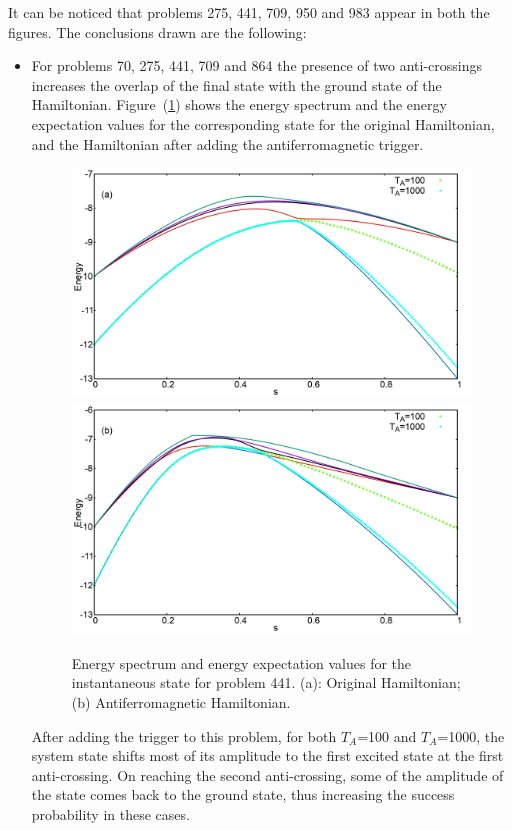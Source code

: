 \documentclass[../main.tex]{subfiles}
\begin{document}
It can be noticed that problems 275, 441, 709, 950 and 983 appear in both the figures. The conclusions drawn are the following:
\begin{itemize}
\item For problems 70, 275, 441, 709 and 864 the presence of two anti-crossings increases the overlap of the final state with the ground state of the Hamiltonian. Figure~(\ref{fig:a28}) shows the energy spectrum and the energy expectation values for the corresponding state for the original Hamiltonian, and the Hamiltonian after adding the antiferromagnetic trigger.


\begin{figure}
\centering 
\includegraphics[scale=0.24]{441_O_T100_1000.png}
\includegraphics[scale=0.24]{441_A_g1_T100_1000.png}
\caption{Energy spectrum and energy expectation values for the instantaneous state for problem 441. (a): Original Hamiltonian; (b) Antiferromagnetic Hamiltonian.}
\label{fig:a28}
\end{figure}


After adding the trigger to this problem, for both $T_A$=100 and $T_A$=1000, the system state shifts most of its amplitude to the first excited state at the first anti-crossing. On reaching the second anti-crossing, some of the amplitude of the state comes back to the ground state, thus increasing the success probability in these cases.


\end{itemize}
\end{document}
